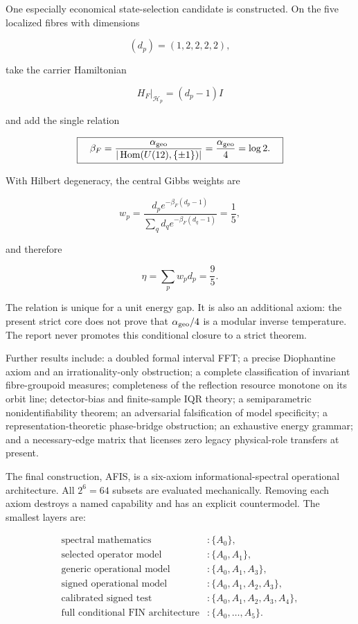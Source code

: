 \documentclass[11pt,a4paper,openany]{report}
\begin{document}
One especially economical state-selection candidate is constructed. On the five localized fibres with dimensions

\[
(d_p)=(1,2,2,2,2),
\]

take the carrier Hamiltonian

\[
H_F|_{\mathcal H_p}=(d_p-1)I
\]

and add the single relation

\[
\boxed{\quad
\beta_F
=\frac{\alpha_{\rm geo}}
{|\operatorname{Hom}(U(12),\{\pm1\})|}
=\frac{\alpha_{\rm geo}}4
=\log2 .
\quad}
\]

With Hilbert degeneracy, the central Gibbs weights are

\[
w_p
=
\frac{d_p e^{-\beta_F(d_p-1)}}
{\sum_q d_q e^{-\beta_F(d_q-1)}}
=\frac15,
\]

and therefore

\[
\eta=\sum_p w_p d_p=\frac95.
\]

The relation is unique for a unit energy gap. It is also an additional axiom: the present strict core does not prove that \(\alpha_{\rm geo}/4\) is a modular inverse temperature. The report never promotes this conditional closure to a strict theorem.

Further results include: a doubled formal interval FFT; a precise Diophantine axiom and an irrationality-only obstruction; a complete classification of invariant fibre-groupoid measures; completeness of the reflection resource monotone on its orbit line; detector-bias and finite-sample IQR theory; a semiparametric nonidentifiability theorem; an adversarial falsification of model specificity; a representation-theoretic phase-bridge obstruction; an exhaustive energy grammar; and a necessary-edge matrix that licenses zero legacy physical-role transfers at present.

The final construction, AFIS, is a six-axiom informational-spectral operational architecture. All \(2^6=64\) subsets are evaluated mechanically. Removing each axiom destroys a named capability and has an explicit countermodel. The smallest layers are:

\[
\begin{aligned}
\text{spectral mathematics} &: \{A_0\},\\
\text{selected operator model} &: \{A_0,A_1\},\\
\text{generic operational model} &: \{A_0,A_1,A_3\},\\
\text{signed operational model} &: \{A_0,A_1,A_2,A_3\},\\
\text{calibrated signed test} &: \{A_0,A_1,A_2,A_3,A_4\},\\
\text{full conditional FIN architecture} &: \{A_0,\ldots,A_5\}.
\end{aligned}
\]
\end{document}

